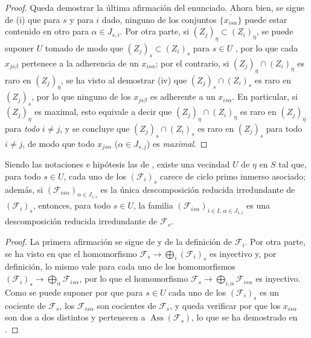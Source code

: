 \begin{proof}
Queda demostrar la última afirmación del enunciado.
Ahora bien, se sigue de (i) que para $s$ y para $i$ dado, ninguno de los conjuntos $\overline{\{x_{is\alpha}\}}$ puede estar contenido en otro para $\alpha\in J_{s,i}$.
Por otra parte, si $(Z_j)_\eta\subset(Z_i)_\eta$, se puede suponer $U$ tomado de modo que $(Z_j)_s\subset(Z_i)_s$ para $s\in U$ , por lo que cada $x_{js\beta}$ pertenece a la adherencia de un $x_{is\alpha}$; por el contrario, si $(Z_j)_\eta\cap(Z_i)_\eta$ es raro en $(Z_j)_\eta$, se ha visto al demostrar (iv) que $(Z_j)_s\cap(Z_i)_s$ es raro en $(Z_j)_s$, por lo que ninguno de los $x_{js\beta}$ es adherente a un $x_{is\alpha}$.
En particular, si $(Z_j)_\eta$ es maximal, esto equivale a decir que $(Z_j)_\eta\cap(Z_i)_\eta$ es raro en $(Z_j)_\eta$ para \emph{todo} $i\neq j$, y se concluye que $(Z_j)_s\cap(Z_i)_s$ es raro en $(Z_j)_s$ para todo $i\neq j$, de modo que todo $x_{js\alpha}$ ($\alpha\in J_{s,j}$) es \emph{maximal}.
\end{proof}

\begin{corollary}[9.8.4]
\label{IV.9.8.4}
Siendo las notaciones e hipótesis las de \emph{}, existe una vecindad $U$ de $\eta$ en $S$ tal que, para todo $s\in U$, cada uno de los $(\mathcal F_i)_s$ carece de ciclo primo inmerso asociado; además, si $(\mathcal F_{is\alpha})_{\alpha\in J_{s,i}}$ es la única descomposición reducida irredundante de $(\mathcal F_i)_s$, entonces, para todo $s\in U$, la familia $(\mathcal F_{is\alpha})_{i\in I,\,\alpha\in J_{s,i}}$ es una descomposición reducida irredundante de $\mathcal F_s$.
\end{corollary}

\begin{proof}
\label{IV.9.8.4-proof}
La primera afirmación se sigue de  y de la definición de $\mathcal F_i$.
Por otra parte, se ha visto en  que el homomorfismo $\mathcal F_s\to\bigoplus_i(\mathcal F_i)_s$ es inyectivo y, por definición, lo mismo vale para cada uno de los homomorfismos $(\mathcal F_i)_s\to\bigoplus_\alpha\mathcal F_{is\alpha}$, por lo que el homomorfismo $\mathcal F_s\to\bigoplus_{i,\alpha}\mathcal F_{is\alpha}$ es inyectivo.
Como se puede suponer por  que para $s\in U$ cada uno de los $(\mathcal F_i)_s$ es un cociente de $\mathcal F_s$, los $\mathcal F_{is\alpha}$ son cocientes de $\mathcal F_s$, y queda verificar por  que los $x_{is\alpha}$ son dos a dos distintos y pertenecen a $\operatorname{Ass}(\mathcal F_s)$, lo que se ha demostrado en .
\end{proof}


